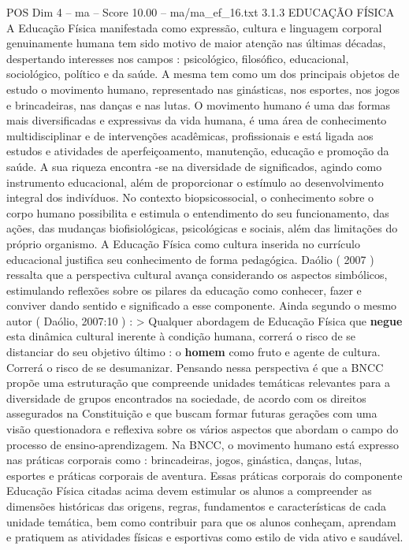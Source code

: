 \begin{textsample}{POS Dim 4 – ma – Score 10.00 – ma/ma\_ef\_16.txt}  \label{ex:f4_pos_059}
3.1.3 EDUCAÇÃO FÍSICA A Educação Física manifestada como expressão, cultura e linguagem corporal genuinamente humana tem sido motivo de maior atenção nas últimas décadas, despertando interesses nos campos : psicológico, filosófico, educacional, sociológico, político e da saúde.
A mesma tem como um dos principais objetos de estudo o movimento humano, representado nas ginásticas, nos esportes, nos jogos e brincadeiras, nas danças e nas lutas.
O movimento humano é uma das formas mais diversificadas e expressivas da vida humana, é uma área de conhecimento multidisciplinar e de intervenções acadêmicas, profissionais e está ligada aos estudos e atividades de aperfeiçoamento, manutenção, educação e promoção da saúde.
A sua riqueza encontra -se na diversidade de significados, agindo como instrumento educacional, além de proporcionar o estímulo ao desenvolvimento integral dos indivíduos.
No contexto biopsicossocial, o conhecimento sobre o corpo humano possibilita e estimula o entendimento do seu funcionamento, das ações, das mudanças biofisiológicas, psicológicas e sociais, além das limitações do próprio organismo.
A Educação Física como cultura inserida no currículo educacional justifica seu conhecimento de forma pedagógica.
Daólio ( 2007 ) ressalta que a perspectiva cultural avança considerando os aspectos simbólicos, estimulando reflexões sobre os pilares da educação como conhecer, fazer e conviver dando sentido e significado a esse componente.
Ainda segundo o mesmo autor ( Daólio, 2007:10 ) : > Qualquer abordagem de Educação Física que \textbf{negue} esta dinâmica cultural inerente à condição humana, correrá o risco de se distanciar do seu objetivo último : o \textbf{homem} como fruto e agente de cultura.
Correrá o risco de se desumanizar.
Pensando nessa perspectiva é que a BNCC propõe uma estruturação que compreende unidades temáticas relevantes para a diversidade de grupos encontrados na sociedade, de acordo com os direitos assegurados na Constituição e que buscam formar futuras gerações com uma visão questionadora e reflexiva sobre os vários aspectos que abordam o campo do processo de ensino-aprendizagem.
Na BNCC, o movimento humano está expresso nas práticas corporais como : brincadeiras, jogos, ginástica, danças, lutas, esportes e práticas corporais de aventura.
Essas práticas corporais do componente Educação Física citadas acima devem estimular os alunos a compreender as dimensões históricas das origens, regras, fundamentos e características de cada unidade temática, bem como contribuir para que os alunos conheçam, aprendam e pratiquem as atividades físicas e esportivas como estilo de vida ativo e saudável.

\end{textsample}
